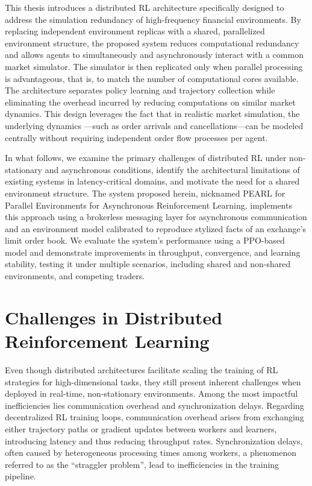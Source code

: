This thesis introduces a distributed RL architecture specifically designed to address the simulation redundancy of high-frequency financial environments.
By replacing independent environment replicas with a shared, parallelized environment structure,
the proposed system reduces computational redundancy and allows agents to simultaneously and asynchronously interact with a common market simulator.
The simulator is then replicated only when parallel processing is advantageous, that is,
to match the number of computational cores available.
The architecture separates policy learning and trajectory collection while eliminating the overhead incurred by reducing computations on similar market dynamics.
This design leverages the fact that in realistic market simulation, the underlying dynamics
---such as order arrivals and cancellations---can be modeled centrally without requiring independent order flow processes per agent.

In what follows, we examine the primary challenges of distributed RL under non-stationary and asynchronous conditions,
identify the architectural limitations of existing systems in latency-critical domains, and motivate the need for a shared environment structure.
The system proposed herein, nicknamed PEARL for Parallel Environments for Asynchronous Reinforcement Learning,
implements this approach using a brokerless messaging layer for asynchronous communication and an environment model
calibrated to reproduce stylized facts of an exchange's limit order book.
We evaluate the system's performance using a PPO-based model and demonstrate improvements in
throughput, convergence, and learning stability, testing it under multiple scenarios, including shared and non-shared environments, and competing traders.

\section{Challenges in Distributed Reinforcement Learning}
\label{sec:challenges}

Even though distributed architectures facilitate scaling the training of RL strategies for
high-dimensional tasks, they still present inherent challenges when deployed in real-time, non-stationary environments.
Among the most impactful inefficiencies lies communication overhead and synchronization delays.
Regarding decentralized RL training loops, communication overhead arises from exchanging either trajectory paths or gradient updates
between workers and learners, introducing latency and thus reducing throughput rates.
Synchronization delays, often caused by heterogeneous processing times among workers, a phenomenon referred to as the ``straggler problem'',
lead to inefficiencies in the training pipeline.


